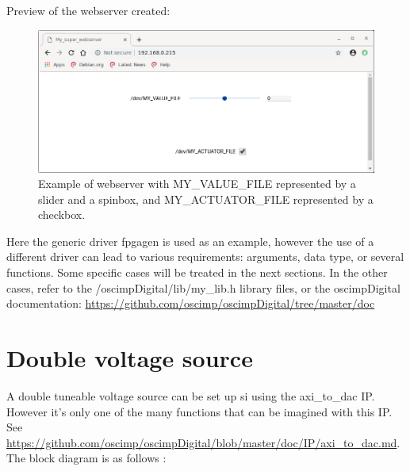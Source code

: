 \documentclass[12pt,oneside]{article}
\begin{document}
Preview of the webserver created:

\begin{figure}[h!tb]
	\begin{center}
		\includegraphics[width=15cm]{webserver/Super_webserver.png}
		\caption{Example of webserver with MY\_VALUE\_FILE represented by a slider and a spinbox, and MY\_ACTUATOR\_FILE represented by a checkbox.}
		\label{fig:doubleDDS}
	\end{center}
\end{figure}

Here the generic driver fpgagen is used as an example, however the use of a different driver can lead to various requirements: arguments, data type, or several functions. Some specific cases will be treated in the next sections. In the other cases, refer to the /oscimpDigital/lib/my\_lib.h library files, or the oscimpDigital documentation: \href{[https://github.com/oscimp/oscimpDigital/tree/master/doc]}{https://github.com/oscimp/oscimpDigital/tree/master/doc}

\section{Double voltage source}

A double tuneable voltage source can be set up si using the axi\_to\_dac IP. However it's only one of the many functions that can be imagined with this IP. 
\newline See \href{[https://github.com/oscimp/oscimpDigital/blob/master/doc/IP/axi_to_dac.md]}{https://github.com/oscimp/oscimpDigital/blob/master/doc/IP/axi\_to\_dac.md}.
The block diagram is as follows :
\end{document}
